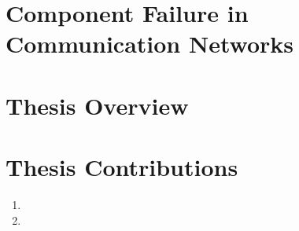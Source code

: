 
\section{Component Failure in Communication Networks}


\section{Thesis Overview}


\section{Thesis Contributions}

\begin{framed}
\begin{enumerate}
	\item {}

	\item {}
\end{enumerate}

\end{framed}
